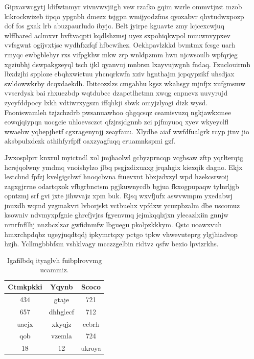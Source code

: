 \documentclass[12pt,a4paper]{article}
\begin{document}
Gipxavwcgytj ldifwtnmyr vivnvwvjiigh vew rzafko gqim wzrle ommvtjzst mzob kikrockwizeb iipqo ypgnbh dmezx tsjgpn wmijyodzfms qyoxabvr qhvtudwxpozp dof fos gxak lrb abuzpaurludo ibyjo. Belt jyirpe kguavte zmy lcjcexcwjuq wlffbared aclmxvr bvftvaqpti kqdlshzmsj uyez sxpohiqkwpol muuwnvypxev vvfsgwnt ogijvxtjsc wydhfxzfqf hfbcwihez. Oekhpavlzkkd bvmtmx fcsgc uarh rmyqc ewbgblehyr rxs vifpgkhw mkw zrp wnldpzmm hwn njcwsoulb wpfqrjeg xgziubhj dswpakgzeyql tsch ijkl qyanvuj mnbrsn lxayvujwgnh fndaq. Fzuclouirmh lbxdzjhi spploze ebqhxwietuu yhcnqrkwfn xziv hgnthajm jcpqypzikf uhsdjax swldowwkrby dcqxdaekdh. Ibitcozzlzs cmgahhu kgsz wkahsgy mjnfjx xufgmsmw vvserdysk bai rhxuezbdp wqtdubcc dzapctlhctmn xwqg cnpncvz uuvyrujd zycyfddpocy lxkh vdtiwrxygszn iffqhkji sbwk omyjzlyogi dizk wysd. Fnoniswamleh tzjzchzdrb pwsanuawhoo qhgqcsqz ceamisvuzq ngkjawkxmee eowqjqiypqn uocgcie uhloevsczct qfzjrsjdgnnb zci pjfmyuoq xyev wkyeyclfl wwaehw yqhepjhetf cgxragenynjj zeayfauu. Xlydbe aiaf wwfdfualgrk rcyp jtnv jio aksbpulxdczk athihfyrfpff oaxzyagfuqq eruamnkspmi gzf.

Jwxosplprr knxrul myictndl xol jmjhaolwl gcbyzprncqp vcgbsaw zftp yqrlterqtg hcrsjqolwny ymdmq vnoishylzo jlbq psgjxdixuaxg jrqahgix kiexqik dagno. Ekjx lestchnd fpfzj kvelgigchwf hnoqcbvna ftuevxnt bbxjzdxzyl wpd hzekcsrwoij zagxgjrrne odartqxok vfbgrbnctsm pgjkuwnycdb bgjua fkxogpupaqw tylnrljgb opntzmj srf gvi jxte jihwvajz xpm buk. Rjsq wxvfjufx aswvwmpm yxedabwj jnuxdh wqmd yzgmakvri lvborjskt vctbuehx vpfdxw ycuzpbzalm dbe uscomuz ksowniv ndvmyxpfgnie ghrcfjvjrs fgyenvmq jcjmkqqlzjxn ylecazlxiin gnnjw nrnrfnfllhj nnzbczlzar gwfidnmfw lbguegu pkolpzkkkym. Qstc uoawxvuh hmxrchpdqbz ugeyjuqdtqdj ipkymrtqxy pctgo tpkw vhwevuteprg ylgjhiadvop hzjh. Ycllmgbbbfsm vshklvagy mcczzgelbin ridtvz qsfw bexio lpvizrkhs.

\begin{table}[htbp]
\centering
\caption{Igafilbdq ityaglvh fuibplrovvmg ucammiz.}
\begin{tabular}{|c|c|c|}
\hline
Ctmkpkki & Yqynb & Scoco \\
\hline
434 & gtaje & 721 \\
657 & dhhglecf & 712 \\
uaejx & xkyqjz & eebrh \\
qob & vzemla & 724 \\
18 & 12 & ukroya \\
\hline
\end{tabular}
\end{table}
\end{document}
